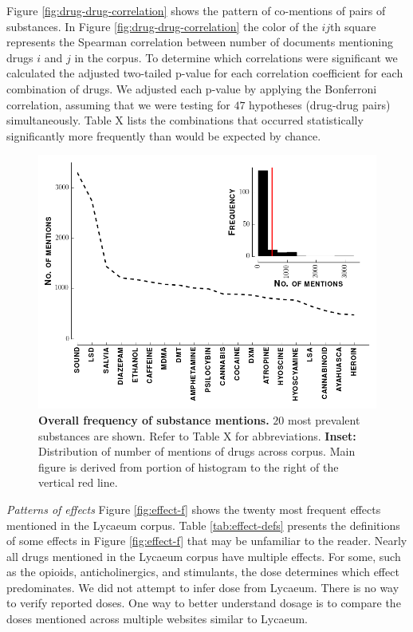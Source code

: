 \documentclass{article}
\begin{document}
  Figure \ref{fig:drug-drug-correlation} shows the pattern of co-mentions of pairs of substances. In Figure \ref{fig:drug-drug-correlation} the color of the $ij$th square represents the Spearman correlation between number of documents mentioning drugs $i$ and $j$ in the corpus. To determine which correlations were significant we calculated the adjusted two-tailed p-value for each correlation coefficient for each combination of drugs. We adjusted each p-value by applying the Bonferroni correlation, assuming that we were testing for $47$ hypotheses (drug-drug pairs) simultaneously. Table X lists the combinations that occurred statistically significantly more frequently than would be expected by chance. 
  
  \begin{figure}[h]
\centering
\includegraphics[scale=0.65]{overall-drug-frequency.png}
\caption{\textbf{Overall frequency of substance mentions.} $20$ most prevalent substances are shown. Refer to Table X for abbreviations. \textbf{Inset:} Distribution of number of mentions of drugs across corpus. Main figure is derived from portion of histogram to the right of the vertical red line.}
\label{fig:overall-f}
\end{figure}
  
\emph{Patterns of effects}
  Figure \ref{fig:effect-f} shows the twenty most frequent effects mentioned in the Lycaeum corpus. Table \ref{tab:effect-defs} presents the definitions of some effects in Figure \ref{fig:effect-f} that may be unfamiliar to the reader. Nearly all drugs mentioned in the Lycaeum corpus have multiple effects. For some, such as the opioids, anticholinergics, and stimulants, the dose determines which effect predominates. We did not attempt to infer dose from Lycaeum. There is no way to verify reported doses. One way to better understand dosage is to compare the doses mentioned across multiple websites similar to Lycaeum. 
\end{document}
